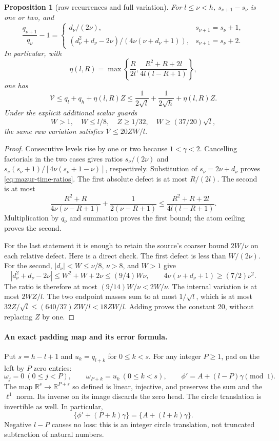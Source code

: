 \documentclass[11pt]{article}
\newtheorem{proposition}{Proposition}
\theoremstyle{remark}\newtheorem{remark}[proposition]{Remark}
\begin{document}
\begin{proposition}[raw recurrences and full variation]
\label{prop:mazur-raw-variation}
For $l\le\nu<h$, $s_{\nu+1}-s_\nu$ is one or two, and
\begin{equation}
 \frac{q_{\nu+1}}{q_\nu}-1=
 \begin{cases}
  d_\nu/(2\nu),&s_{\nu+1}=s_\nu+1,\\[2mm]
  (d_\nu^2+d_\nu-2\nu)/(4\nu(\nu+d_\nu+1)),
       &s_{\nu+1}=s_\nu+2 .
 \end{cases}
 \label{eq:mazur-time-ratios}
\end{equation}
In particular, with
\[
 \eta(l,R)=\max\left\{\frac R{2l},
       \frac{R^2+R+2l}{4l(l-R+1)}\right\},
\]
one has
\begin{equation}
 \mathcal V\le q_l+q_h+\eta(l,R)Z
 \le\frac1{2\sqrt l}+\frac1{2\sqrt h}+\eta(l,R)Z .
 \label{eq:mazur-raw-variation}
\end{equation}
Under the explicit additional scalar guards
\[
 W>1,\quad W\le l/8,\quad Z\ge1/32,\quad
 W\ge(37/20)\sqrt l ,
\]
the same raw variation satisfies $\mathcal V\le20ZW/l$.
\end{proposition}
\begin{proof}
Consecutive levels rise by one or two because $1<\gamma<2$.
Cancelling factorials in the two cases gives ratios
$s_\nu/(2\nu)$ and
$s_\nu(s_\nu+1)/[4\nu(s_\nu+1-\nu)]$, respectively.
Substitution of $s_\nu=2\nu+d_\nu$ proves
\eqref{eq:mazur-time-ratios}.
The first absolute defect is at most $R/(2l)$.
The second is at most
\[
 \frac{R^2+R}{4\nu(\nu-R+1)}
       +\frac1{2(\nu-R+1)}\le
 \frac{R^2+R+2l}{4l(l-R+1)}.
\]
Multiplication by $q_\nu$ and summation proves the first bound;
the atom ceiling proves the second.

For the last statement it is enough to retain the source's
coarser bound $2W/\nu$ on each relative defect.
Here is a direct check. The first defect is less than $W/(2\nu)$.
For the second, $|d_\nu|<W\le\nu/8$, $\nu>8$, and $W>1$
give
\[
 |d_\nu^2+d_\nu-2\nu|
 \le W^2+W+2\nu\le(9/4)W\nu,\qquad
 4\nu(\nu+d_\nu+1)\ge(7/2)\nu^2 .
\]
The ratio is therefore at most $(9/14)W/\nu<2W/\nu$.
The internal variation is at most $2WZ/l$.
The two endpoint masses sum to at most $1/\sqrt l$,
which is at most $32Z/\sqrt l\le(640/37)ZW/l<18ZW/l$.
Adding proves the constant 20, without replacing $Z$ by one.
\end{proof}

\paragraph{An exact padding map and its error formula.}
Put $s=h-l+1$ and $u_k=q_{l+k}$ for $0\le k<s$.
For any integer $P\ge1$, pad on the left by $P$ zero entries:
\[
 \omega_j=0\ (0\le j<P),\qquad
 \omega_{P+k}=u_k\ (0\le k<s),\qquad
 \phi'=A+(l-P)\gamma\pmod1 .
\]
The map $\mathbb R^s\to\mathbb R^{P+s}$ so defined is linear,
injective, and preserves the sum and the $\ell^1$ norm.
Its inverse on its image discards the zero head.
The circle translation is invertible as well. In particular,
\[
 \{\phi'+(P+k)\gamma\}=\{A+(l+k)\gamma\}.
\]
Negative $l-P$ causes no loss: this is an integer circle translation,
not truncated subtraction of natural numbers.
\end{document}

